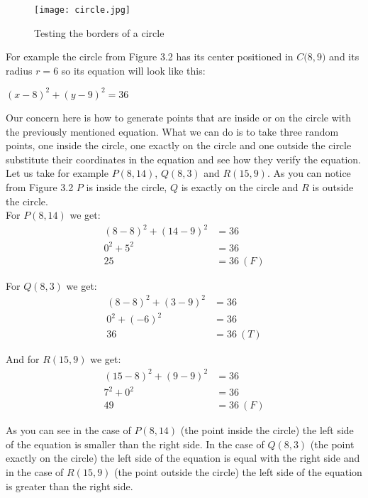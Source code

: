 \begin{figure}[h]
	\caption{Testing the borders of a circle}
	\centering
	\texttt{[image: circle.jpg]}
\end{figure}

For example the circle from Figure 3.2 has its center positioned in $C\big(8, 9\big)$ and its radius $r = 6$ so its equation will look like this:

\begin{center}
	$(x - 8) ^ 2 + (y - 9) ^ 2 = 36$
\end{center}

\newpage
Our concern here is how to generate points that are inside or on the circle with the previously mentioned equation. What we can do is to take three random points, one inside the circle, one exactly on the circle and one outside the circle substitute their coordinates in the equation and see how they verify the equation. Let us take for example $P(8, 14)$, $Q(8, 3)$ and $R(15, 9)$. As you can notice from Figure 3.2 $P$ is inside the circle, $Q$ is exactly on the circle and $R$ is outside the circle.\\

For $P(8, 14)$ we get:
\begin{align*}
	(8 - 8) ^ 2 + (14 - 9) ^ 2 &= 36\\
	0 ^ 2 + 5 ^ 2 &= 36\\
	25 &= 36\ (F)
\end{align*}

For $Q(8, 3)$ we get:
\begin{align*}
(8 - 8) ^ 2 + (3 - 9) ^ 2 &= 36\\
0 ^ 2 + (-6) ^ 2 &= 36\\
36 &= 36\ (T)
\end{align*}

And for $R(15, 9)$ we get:
\begin{align*}
(15 - 8) ^ 2 + (9 - 9) ^ 2 &= 36\\
7 ^ 2 + 0 ^ 2 &= 36\\
49 &= 36\ (F)
\end{align*}

As you can see in the case of $P(8, 14)$ (the point inside the circle) the left side of the equation is smaller than the right side. In the case of $Q(8, 3)$ (the point exactly on the circle) the left side of the equation is equal with the right side and in the case of $R(15, 9)$ (the point outside the circle) the left side of the equation is greater than the right side.\\

